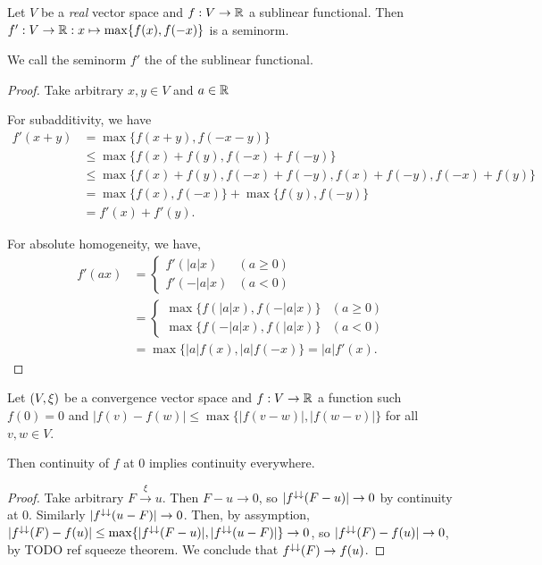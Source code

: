 \begin{lemma}
Let $V$ be a \emph{real} vector space and $f: V \to \mathbb{R}$ a sublinear functional. Then $f': V\to \mathbb{R}: x\mapsto \max\{f(x), f(-x)\}$ is a seminorm.
\end{lemma}
We call the seminorm $f'$ the  of the sublinear functional.
\begin{proof}
Take arbitrary $x,y\in V$ and $a\in \mathbb{R}$

For subadditivity, we have
\begin{align*}
f'(x+y) &= \max\{f(x+y), f(-x-y)\} \\
&\leq \max\{f(x)+f(y), f(-x)+ f(-y)\} \\
&\leq \max\{f(x)+f(y), f(-x)+ f(-y), f(x) + f(-y), f(-x) + f(y)\} \\
&= \max\{f(x), f(-x)\} + \max\{f(y), f(-y)\} \\
&= f'(x) + f'(y).
\end{align*}

For absolute homogeneity, we have,
\begin{align*}
f'(ax) &= \begin{cases}
f'(|a|x) & (a \geq 0) \\ f'(-|a|x) & (a < 0)
\end{cases} \\
&= \begin{cases}
\max\{f(|a|x), f(-|a|x)\} & (a \geq 0) \\ \max\{f(-|a|x), f(|a|x)\} & (a < 0)
\end{cases} \\
&= \max\{|a|f(x), |a|f(-x)\} = |a|f'(x).
\end{align*}
\end{proof}

\begin{lemma} \label{superSubtractiveContinuityEverywhere}
Let $\left( V, \xi \right)$ be a convergence vector space and $f: V\to \mathbb{R}$ a function such $f(0) = 0$ and $|f(v) - f(w)| \leq \max\{|f(v-w)|, |f(w-v)|\}$ for all $v,w\in V$.

Then continuity of $f$ at $0$ implies continuity everywhere.
\end{lemma}
\begin{proof}
Take arbitrary $F\overset{\xi}{\longrightarrow} u$. Then $F-u \to 0$, so $|f^{\downarrow\downarrow}(F-u)|\to 0$ by continuity at $0$. Similarly $|f^{\downarrow\downarrow}(u-F)|\to 0$. Then, by assymption, $|f^{\downarrow\downarrow}(F) - f(u)| \leq \max\{|f^{\downarrow\downarrow}(F-u)|, |f^{\downarrow\downarrow}(u-F)|\} \to 0$, so $|f^{\downarrow\downarrow}(F) - f(u)| \to 0$, by TODO ref squeeze theorem. We conclude that $f^{\downarrow\downarrow}(F)\to f(u)$.
\end{proof}

